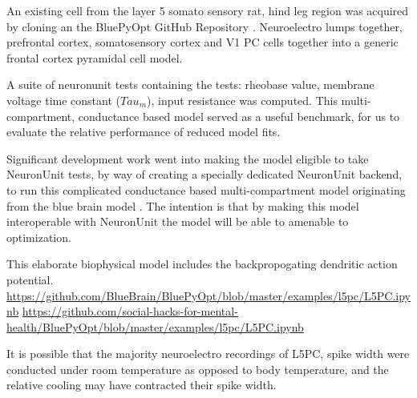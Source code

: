 An existing cell from the layer 5 somato sensory rat, hind leg region was acquired by cloning an the BluePyOpt GitHub Repository \cite{van2016bluepyopt}.
Neuroelectro lumps together, prefrontal cortex, somatosensory cortex and V1 PC cells together into a generic frontal cortex pyramidal cell model. 


%
A suite of neuronunit tests containing the tests: rheobase value, membrane voltage time constant ($Tau_{m}$), input resistance was computed. This multi-compartment, conductance based model served as a useful benchmark, for us to evaluate the relative performance of reduced model fits. 



Significant development work went into making the model eligible to take NeuronUnit tests, by way of creating a specially dedicated NeuronUnit backend, to run this complicated conductance based multi-compartment model originating from the blue brain model \cite{markram2015reconstruction}. The intention is that by making this model interoperable with NeuronUnit the model will be able to amenable to optimization.


This elaborate biophysical model includes the backpropogating dendritic action potential.
\url{https://github.com/BlueBrain/BluePyOpt/blob/master/examples/l5pc/L5PC.ipynb}
\url{https://github.com/social-hacks-for-mental-health/BluePyOpt/blob/master/examples/l5pc/L5PC.ipynb}


It is possible that the majority neuroelectro recordings of L5PC, spike width were conducted under room temperature as opposed to body temperature, and the relative cooling may have contracted their spike width.
\cite{goldin2017temperature}

